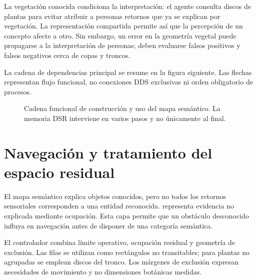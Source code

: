 La vegetación conocida condiciona la interpretación: el agente consulta discos de plantas para evitar atribuir a personas retornos que ya se explican por vegetación. La representación compartida permite así que la percepción de un concepto afecte a otro. Sin embargo, un error en la geometría vegetal puede propagarse a la interpretación de personas; deben evaluarse falsos positivos y falsos negativos cerca de copas y troncos.

La cadena de dependencias principal se resume en la figura siguiente. Las flechas representan flujo funcional, no conexiones DDS exclusivas ni orden obligatorio de procesos.
\begin{figure}[htbp]
\centering
{}
\caption{Cadena funcional de construcción y uso del mapa semántico. La memoria DSR interviene en varios pasos y no únicamente al final.}
\end{figure}

\section{Navegación y tratamiento del espacio residual}
El mapa semántico explica objetos conocidos, pero no todos los retornos sensoriales corresponden a una entidad reconocida.  representa evidencia no explicada mediante ocupación. Esta capa permite que un obstáculo desconocido influya en navegación antes de disponer de una categoría semántica.

El controlador combina límite operativo, ocupación residual y geometría de exclusión. Las filas se utilizan como rectángulos no transitables; para plantas no agrupadas se emplean discos del tronco. Los márgenes de exclusión expresan necesidades de movimiento y no dimensiones botánicas medidas.

